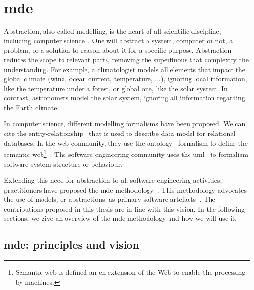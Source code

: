 \section[Model-Driven Engineering]{\glsdesc{mde}}

Abstraction, also called modelling, is the heart of all scientific discipline, including computer science~\cite{DBLP:journals/cacm/Kramer07}.
One will abstract a system, computer or not, a problem, or a solution to reason about it for a specific purpose.
Abstraction reduces the scope to relevant parts, removing the superfluous that complexity the understanding.
For example, a climatologist models all elements that impact the global climate (wind, ocean current, temperature, ...), ignoring local information, like the temperature under a forest, or global one, like the solar system.
In contrast, astronomers model the solar system, ignoring all information regarding the Earth climate.

In computer science, different modelling formalisms have been proposed. 
We can cite the entity-relationship~\cite{DBLP:journals/tods/Chen76} that is used to describe data model for relational databases.
In the web community, they use the ontology~\cite{DBLP:journals/ijmms/Gruber95} formalism to define the semantic web\footnote{Semantic web is defined an en extension of the Web to enable the processing by machines.}~\cite{berners2001semantic}.
The software engineering community uses the \gls{uml}~\cite{omg2017umlspec} to formalism software system structure or behaviour.

Extending this need for abstraction to all software engineering activities, practitioners have proposed the \gls{mde} methodology~\cite{DBLP:journals/computer/Schmidt06,DBLP:conf/ifm/Kent02}.
This methodology advocates the use of models, or abstractions, as primary software artefacts~\cite{DBLP:journals/software/WhittleHR14}.
The contributions proposed in this thesis are in line with this vision.
In the following sections, we give an overview of the \gls{mde} methodology and how we will use it.


\subsection{\gls{mde}: principles and vision}

